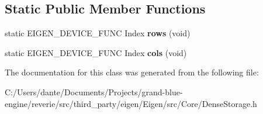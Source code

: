 \subsection*{Static Public Member Functions}
\begin{DoxyCompactItemize}
\item 
\mbox{\label{class_eigen_1_1_dense_storage_3_01_t_00_010_00_01___rows_00_01___cols_00_01___options_01_4_abb2f94317cb7458aba59d812bce90134}} 
static E\+I\+G\+E\+N\+\_\+\+D\+E\+V\+I\+C\+E\+\_\+\+F\+U\+NC Index {\bfseries rows} (void)
\item 
\mbox{\label{class_eigen_1_1_dense_storage_3_01_t_00_010_00_01___rows_00_01___cols_00_01___options_01_4_ab00b677e630f1a91a5cb271fc8609e9b}} 
static E\+I\+G\+E\+N\+\_\+\+D\+E\+V\+I\+C\+E\+\_\+\+F\+U\+NC Index {\bfseries cols} (void)
\end{DoxyCompactItemize}


The documentation for this class was generated from the following file\+:\begin{DoxyCompactItemize}
\item 
C\+:/\+Users/dante/\+Documents/\+Projects/grand-\/blue-\/engine/reverie/src/third\+\_\+party/eigen/\+Eigen/src/\+Core/Dense\+Storage.\+h\end{DoxyCompactItemize}
